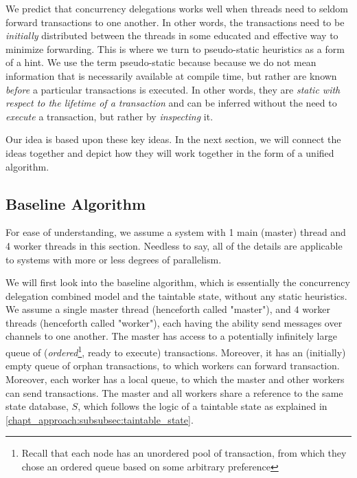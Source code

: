 We predict that concurrency delegations works well when threads need to seldom forward transactions
to one another. In other words, the transactions need to be \textit{initially} distributed between
the threads in some educated and effective way to minimize forwarding. This is where we turn to
pseudo-static heuristics as a form of a hint. We use the term pseudo-static because because we do
not mean information that is necessarily available at compile time, but rather are known
\textit{before} a particular transactions is executed. In other words, they are \textit{static with
respect to the lifetime of a transaction} and can be inferred without the need to \textit{execute} a
transaction, but rather by \textit{inspecting} it.

Our idea is based upon these key ideas. In the next section, we will connect the ideas together and
depict how they will work together in the form of a unified algorithm.

\subsection{Baseline Algorithm} \label{subsec:baseline_alg}

\begin{remark}
	For ease of understanding, we assume a system with 1 main (master) thread and 4 worker threads
	in this section. Needless to say, all of the details are applicable to systems with more or less
	degrees of parallelism.
\end{remark}

We will first look into the baseline algorithm, which is essentially the concurrency delegation
combined model and the taintable state, without any static heuristics. We assume a single master
thread (henceforth called "master"), and $4$ worker threads (henceforth called "worker"), each
having the ability send messages over channels to one another. The master has access to a
potentially infinitely large queue of (\textit{ordered}\footnote{Recall that each node has an
unordered pool of transaction, from which they chose an ordered queue based on some arbitrary
preference}, ready to execute) transactions. Moreover, it has an (initially) empty queue of orphan
transactions, to which workers can forward transaction. Moreover, each worker has a local queue, to
which the master and other workers can send transactions. The master and all workers share a
reference to the same state database, $S$, which follows the logic of a taintable state as explained
in \ref{chapt_approach:subsubsec:taintable_state}.

